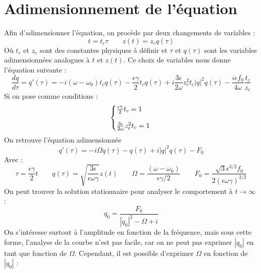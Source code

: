 \section{Adimensionnement de l'équation}
%
Afin d'adimensionner l'équation, on procède par deux changements de variables :
%
\begin{equation}
    t = t_c \tau
    \qquad 
    z(t) = z_c q(\tau)
\end{equation}
Où $t_c$ et $z_c$ sont des constantes physiques à définir et $\tau$ et $q(\tau)$ sont les variables adimensionnées analogues à $t$ et $z(t)$.
Ce choix de variables nous donne l'équation suivante :
%
\begin{equation}
    \frac{dq}{d\tau} = q'(\tau) = -i(\omega - \omega_0)t_c q(\tau) - \frac{\epsilon\gamma}{2}t_c q(\tau) + i \frac{3\epsilon}{2\omega}z_c^2t_c |q|^2q(\tau) - \frac{i\epsilon f_0}{4\omega}\frac{t_c}{z_c}
\end{equation}
%
Si on pose comme conditions :
%
\begin{equation}
    \left\{
    \begin{array}{@{}l@{}}
        \frac{\epsilon\gamma}{2}t_c = 1 \\
        \\
        \frac{3\epsilon}{2\omega}z_c^2t_c = 1
    \end{array}
    \right.\,
\end{equation}
%
On retrouve l'équation adimensionnée
%
\begin{equation}
    q'(\tau) = -i\Omega q(\tau) - q(\tau) + i|q|^2q(\tau) - F_0
\end{equation}
%
Avec :
%
\begin{equation}
    \tau = \frac{\epsilon\gamma}{2}t
    \qquad
    q(\tau) = \sqrt{\frac{3\epsilon}{\epsilon\omega\gamma}}z(t)
    \qquad
    \Omega = \frac{(\omega - \omega_0)}{\epsilon\gamma/2}
    \qquad
    F_0 = \frac{\sqrt{3}\epsilon^{3/2} f_0}{2(\epsilon \omega \gamma)^{3/2}}
\end{equation}
%
On peut trouver la solution stationnaire pour analyser le comportement à $t\to\infty$ :
%
\begin{equation}
    q_0 = \frac{F_0}{|q_0|^2 - \Omega + i}
    \label{eq:duff_stationnaire}
\end{equation}
%
On s'intéresse surtout à l'amplitude en fonction de la fréquence, 
mais sous cette forme, l'analyse de la courbe n'est pas facile, car on ne peut pas exprimer $|q_0|$ en tant que fonction de $\Omega$. 
Cependant, il est possible d'exprimer $\Omega$ en fonction de $|q_0|$ :
